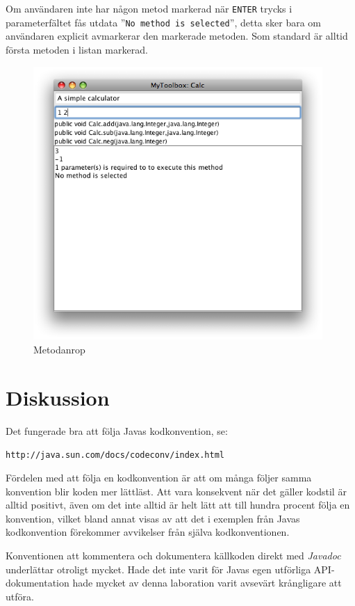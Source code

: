 \documentclass[a4paper, 12pt]{article}
\begin{document}
Om användaren inte har någon metod markerad när \verb!ENTER! trycks i
parameterfältet fås utdata ''\verb!No method is selected!'', detta sker
bara om användaren explicit avmarkerar den markerade metoden. Som
standard är alltid första metoden i listan markerad.

\begin{figure}[H]
  \begin{center}
    \includegraphics[width=110mm]{images/test1-out.png}
    \caption{Metodanrop}
    \label{fig:test1-out}
  \end{center}
\end{figure}

\section{Diskussion}

Det fungerade bra att följa Javas kodkonvention, se:

\verb!http://java.sun.com/docs/codeconv/index.html!

Fördelen med att följa en kodkonvention är att om många följer samma
konvention blir koden mer lättläst. Att vara konsekvent när det gäller
kodstil är alltid positivt, även om det inte alltid är helt lätt att
till hundra procent följa en konvention, vilket bland annat visas av
att det i exemplen från Javas kodkonvention förekommer avvikelser från
själva kodkonventionen.

Konventionen att kommentera och dokumentera källkoden direkt med
\textit{Javadoc} underlättar otroligt mycket. Hade det inte varit för
Javas egen utförliga API-dokumentation hade mycket av denna laboration
varit  avsevärt krång\-ligare att utföra.
\end{document}
